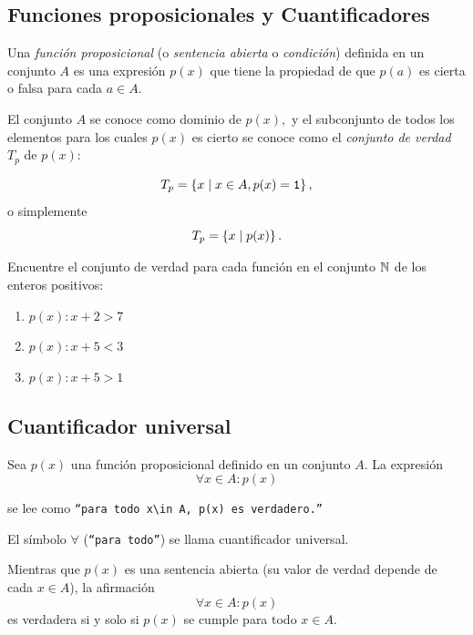 \subsection{Funciones proposicionales y Cuantificadores}


 Una \emph{funci\'on proposicional} (o \emph{sentencia abierta} o \emph{condici\'on}) definida en un conjunto $A$ es una expresi\'on $p(x)$ que tiene la propiedad de que $p(a)$ es cierta o falsa para cada $a \in A.$



 El conjunto $A$ se conoce como dominio de $p(x),$ y el subconjunto de todos los elementos para los cuales $p(x)$ es cierto se conoce como el \emph{conjunto de verdad} $T_{p}$ de $p(x):$
 
 $$T_{p}=\left\{ x \mid x\in A, p(x)=\texttt{1} \right\},$$ 
 o simplemente 
 $$
 T_{p}=\left\{ x \mid p(x) \right\}.
 $$



 \begin{exmp}
  \label{lip:exmp:4.7}
  Encuentre el conjunto de verdad para cada funci\'on en el conjunto $\mathbb{N}$ de los enteros positivos:
  \begin{enumerate}
   \item $p(x): x+2>7$ 
   \item $p(x): x+5<3$ 
   \item $p(x): x+5>1$ 
  \end{enumerate}

 \end{exmp}



\subsection{Cuantificador universal}


 Sea $p(x)$ una funci\'on proposicional definido en un conjunto $A.$ La expresi\'on
 \begin{equation}
 \label{lip:4.1}
   \forall x \in A: p(x)
 \end{equation}

 
 se lee como  \texttt{``para todo $x\in A,$ $p(x)$ es verdadero.''}  
 
 El s\'imbolo $\forall$ (\texttt{``para todo''}) se llama cuantificador universal.




 Mientras que $p(x)$ es una sentencia abierta (su valor de verdad depende de cada $x\in A$), la afirmaci\'on 
 $$\forall x\in A: p(x)$$ es verdadera si y solo si $p(x)$ se cumple para todo $x\in A.$  



